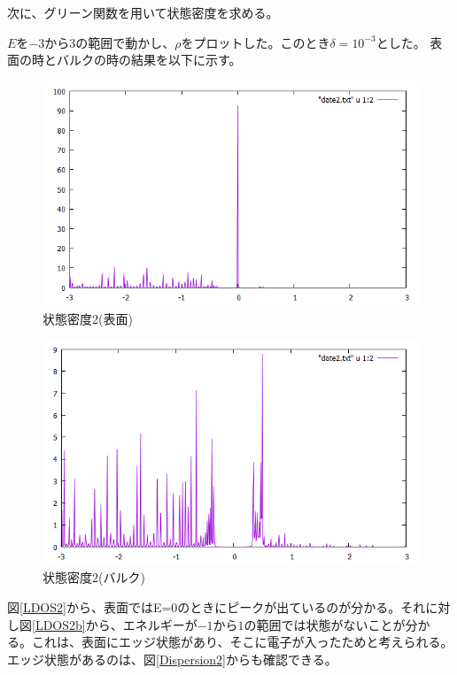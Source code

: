 \documentclass{jsarticle}
\begin{document}
            次に、グリーン関数を用いて状態密度を求める。
            
            $E$を$-3$から$3$の範囲で動かし、$\rho$をプロットした。このとき$\delta=10^{-3}$とした。
            表面の時とバルクの時の結果を以下に示す。
    
            \begin{figure}[H]
                \centering
                \includegraphics[scale=0.5]{LDOS2.png}
                \caption{状態密度2(表面)}
                \label{LDOS2}
            \end{figure}

            \begin{figure}[H]
                \centering
                \includegraphics[scale=0.5]{LDOS2b.png}
                \caption{状態密度2(バルク)}
                \label{LDOS2b}
            \end{figure}

            図\eqref{LDOS2}から、表面ではE=0のときにピークが出ているのが分かる。それに対し図\eqref{LDOS2b}から、エネルギーが$-1$から$1$の範囲では状態がないことが分かる。これは、表面にエッジ状態があり、そこに電子が入ったためと考えられる。エッジ状態があるのは、図\eqref{Dispersion2}からも確認できる。
    
\end{document}
